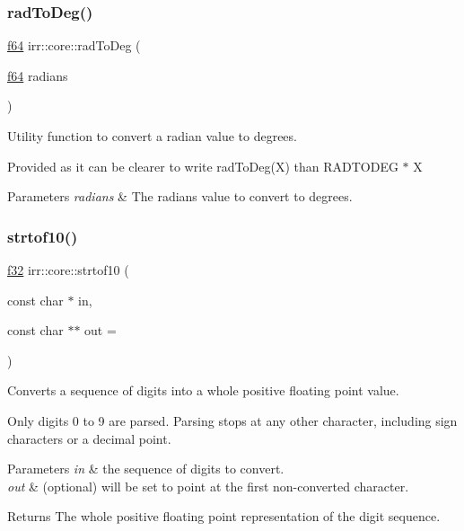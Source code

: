 \subsubsection{\texorpdfstring{rad\+To\+Deg()}{radToDeg()}\hspace{0.1cm}{\footnotesize\ttfamily [2/2]}}
{\footnotesize\ttfamily \hyperlink{namespaceirr_a1325b02603ad449f92c68fc640af9b28}{f64} irr\+::core\+::rad\+To\+Deg (\begin{DoxyParamCaption}\item[{\hyperlink{namespaceirr_a1325b02603ad449f92c68fc640af9b28}{f64}}]{radians }\end{DoxyParamCaption})\hspace{0.3cm}{\ttfamily [inline]}}



Utility function to convert a radian value to degrees. 

Provided as it can be clearer to write rad\+To\+Deg(\+X) than R\+A\+D\+T\+O\+D\+EG $\ast$ X 
\begin{DoxyParams}{Parameters}
{\em radians} & The radians value to convert to degrees. \\
\hline
\end{DoxyParams}
\mbox{\label{namespaceirr_1_1core_a032ec5ae63987749c7b30c18ea4ccd92}} 
\subsubsection{\texorpdfstring{strtof10()}{strtof10()}}
{\footnotesize\ttfamily \hyperlink{namespaceirr_a0277be98d67dc26ff93b1a6a1d086b07}{f32} irr\+::core\+::strtof10 (\begin{DoxyParamCaption}\item[{const char $\ast$}]{in,  }\item[{const char $\ast$$\ast$}]{out = {} }\end{DoxyParamCaption})\hspace{0.3cm}{\ttfamily [inline]}}



Converts a sequence of digits into a whole positive floating point value. 

Only digits 0 to 9 are parsed. Parsing stops at any other character, including sign characters or a decimal point. 
\begin{DoxyParams}{Parameters}
{\em in} & the sequence of digits to convert. \\
\hline
{\em out} & (optional) will be set to point at the first non-\/converted character. \\
\hline
\end{DoxyParams}
\begin{DoxyReturn}{Returns}
The whole positive floating point representation of the digit sequence. 
\end{DoxyReturn}
\mbox{\label{namespaceirr_1_1core_a6ff97e442233218d18acd56add48766f}} 
